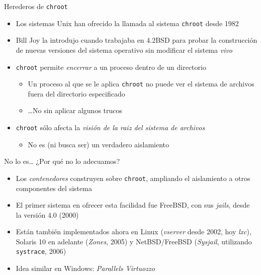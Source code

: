 \documentclass[presentation]{beamer}
\begin{document}
\begin{frame}[label={sec:org3ac47fe},fragile]{Herederos de \texttt{chroot}}
 \begin{itemize}
\item Los sistemas Unix han ofrecido la llamada al sistema \texttt{chroot} desde
1982
\item Bill Joy la introdujo cuando trabajaba en 4.2BSD para probar la
construcción de nuevas versiones del sistema operativo sin
modificar el sistema \emph{vivo}
\item \texttt{chroot} permite \emph{encerrar} a un proceso dentro de un directorio
\begin{itemize}
\item Un proceso al que se le aplica \texttt{chroot} no puede ver el sistema de
archivos fuera del directorio especificado
\item \ldots{}No sin aplicar algunos trucos
\end{itemize}
\item \texttt{chroot} sólo afecta la \emph{visión de la raiz del sistema de
archivos}
\begin{itemize}
\item No es (ni busca ser) un verdadero aislamiento
\end{itemize}
\end{itemize}
\end{frame}

\begin{frame}[label={sec:org6a1d538},fragile]{No lo es\ldots{} ¿Por qué no lo adecuamos?}
 \begin{itemize}
\item Los \emph{contenedores} construyen sobre \texttt{chroot}, ampliando el
aislamiento a otros componentes del sistema
\item El primer sistema en ofrecer esta facilidad fue FreeBSD, con sus
\emph{jails}, desde la versión 4.0 (2000)
\item Están también implementados ahora en Linux (\emph{vserver} desde 2002,
hoy \emph{lxc}), Solaris 10 en adelante (\emph{Zones}, 2005) y NetBSD/FreeBSD
(\emph{Sysjail}, utilizando \texttt{systrace}, 2006)
\item Idea similar en Windows: \emph{Parallels Virtuozzo}
\end{itemize}
\end{frame}
\end{document}
